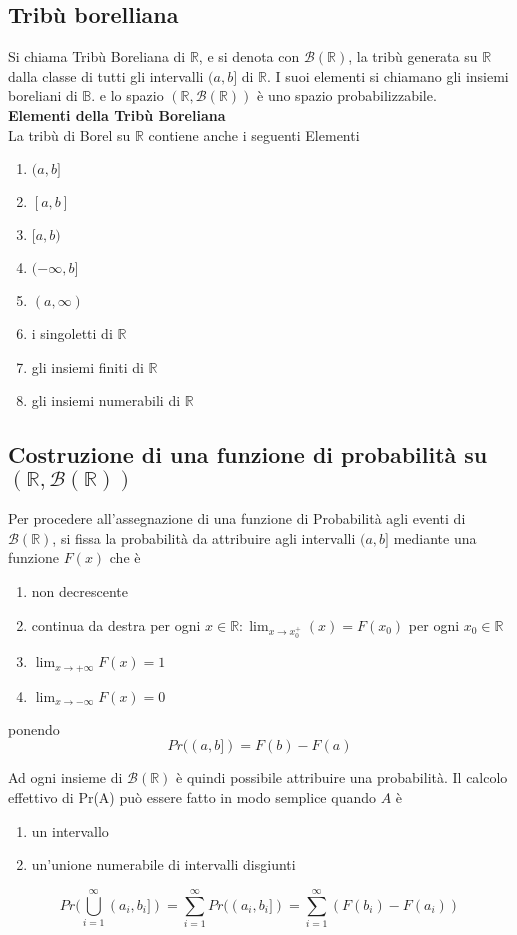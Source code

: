 \documentclass[a4paper]{report}
\begin{document}
  \subsection{Tribù borelliana}
  Si chiama Tribù Boreliana di $\mathbb{R}$, e si denota con $\mathcal{B}(\mathbb{R})$, la tribù generata su $\mathbb{R}$ dalla classe di tutti gli intervalli $(a,b]$ di $\mathbb{R}$. I suoi elementi si chiamano gli insiemi boreliani di $\mathbb{B}$. e lo spazio $(\mathbb{R},\mathcal{B}(\mathbb{R}))$ è uno spazio probabilizzabile.\\
  \textbf{Elementi della Tribù Boreliana}\\
  La tribù di Borel su $\mathbb{R}$ contiene anche i seguenti Elementi
  \begin{enumerate}
    \item $(a,b]$
    \item $[a,b]$
    \item $[a,b)$
    \item $(-\infty, b]$
    \item $(a, \infty)$
    \item i singoletti di $\mathbb{R}$
    \item gli insiemi finiti di $\mathbb{R}$
    \item gli insiemi numerabili di $\mathbb{R}$
  \end{enumerate}

  \subsection{Costruzione di una funzione di probabilità su $(\mathbb{R},\mathcal{B}(\mathbb{R}))$}
  Per procedere all'assegnazione di una funzione di Probabilità agli eventi di $\mathcal{B}(\mathbb{R})$, si fissa la probabilità da attribuire agli intervalli $(a,b]$ mediante una funzione $F(x)$ che è
  \begin{enumerate}
    \item non decrescente
    \item continua da destra per ogni $x \in \mathbb{R}: \lim_{x\to x_0^+}(x) = F(x_0)$ per ogni $x_0 \in \mathbb{R}$
    \item $\lim_{x\to +\infty} F(x) = 1$
    \item $\lim_{x\to -\infty} F(x) = 0$
  \end{enumerate}
  ponendo
  \[ Pr((a,b]) = F(b) - F(a) \]

  Ad ogni insieme di $\mathcal{B}(\mathbb{R})$ è quindi possibile attribuire una probabilità. Il calcolo effettivo di Pr(A) può essere fatto in modo semplice quando $A$ è
  \begin{enumerate}
    \item un intervallo
    \item un'unione numerabile di intervalli disgiunti
  \end{enumerate}
  \[ Pr(\bigcup\limits_{i=1}^{\infty} (a_i,b_i]) = \sum_{i=1}^{\infty} Pr((a_i,b_i]) = \sum_{i=1}^{\infty} (F(b_i)-F(a_i)) \]
\end{document}
